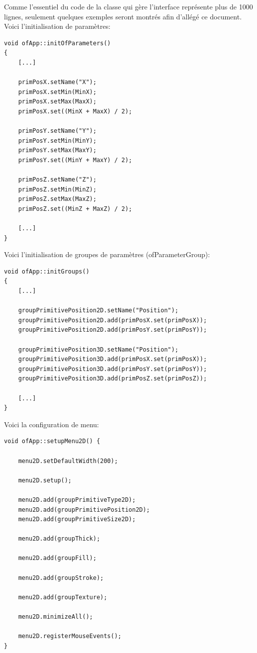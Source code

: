 Comme l'essentiel du code de la classe qui gère l'interface représente plus de 1000 lignes, seulement quelques exemples seront montrés afin d'allégé ce document.\\

Voici l'initialisation de paramètres:
\begin{lstlisting}
void ofApp::initOfParameters() 
{
	[...]
	
	primPosX.setName("X");
	primPosX.setMin(MinX);
	primPosX.setMax(MaxX);
	primPosX.set((MinX + MaxX) / 2);
	
	primPosY.setName("Y");
	primPosY.setMin(MinY);
	primPosY.setMax(MaxY);
	primPosY.set((MinY + MaxY) / 2);
	
	primPosZ.setName("Z");
	primPosZ.setMin(MinZ);
	primPosZ.setMax(MaxZ);
	primPosZ.set((MinZ + MaxZ) / 2);
	
	[...]
}
\end{lstlisting}

Voici l'initialisation de groupes de paramètres (ofParameterGroup):
\begin{lstlisting}
void ofApp::initGroups()
{
	[...]
	
	groupPrimitivePosition2D.setName("Position");
	groupPrimitivePosition2D.add(primPosX.set(primPosX));
	groupPrimitivePosition2D.add(primPosY.set(primPosY));
	
	groupPrimitivePosition3D.setName("Position");
	groupPrimitivePosition3D.add(primPosX.set(primPosX));
	groupPrimitivePosition3D.add(primPosY.set(primPosY));
	groupPrimitivePosition3D.add(primPosZ.set(primPosZ));
	
	[...]
}
\end{lstlisting}

Voici la configuration de menu:
\begin{lstlisting}
void ofApp::setupMenu2D() {

	menu2D.setDefaultWidth(200);
	
	menu2D.setup();
	
	menu2D.add(groupPrimitiveType2D);
	menu2D.add(groupPrimitivePosition2D);
	menu2D.add(groupPrimitiveSize2D);
	
	menu2D.add(groupThick);
	
	menu2D.add(groupFill);
	
	menu2D.add(groupStroke);
	
	menu2D.add(groupTexture);
	
	menu2D.minimizeAll();
	
	menu2D.registerMouseEvents();
}
\end{lstlisting}

